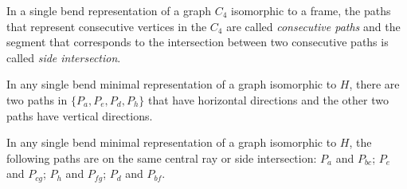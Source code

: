 \documentclass[runningheads]{llncs}
\begin{document}
\begin{definition}
In a single bend representation of a graph $C_4$ isomorphic to a frame, the paths that represent consecutive vertices in the $C_4$ are called \emph{consecutive paths} and the segment that corresponds to the intersection between two consecutive paths is called \emph{side intersection}.  
\end{definition}

\begin{lemma}\label{lem:2vertical2horizontal}
In any single bend minimal representation of a graph isomorphic to $H$, there are two paths in $\{P_a, P_e, P_{d}, P_{h} \}$ that have horizontal directions and the other two paths have vertical directions.
\end{lemma}




\begin{corollary} \label{coro:paresMesmoSegmento}
In any single bend minimal representation of a graph isomorphic to $H$, the following paths are on the same central ray or side intersection: $P_{a}$ and $P_{bc}$; $P_{e}$ and $P_{cg}$; $P_{h}$ and $P_{fg}$; $P_{d}$ and $P_{bf}$.

\end{corollary}
\end{document}
